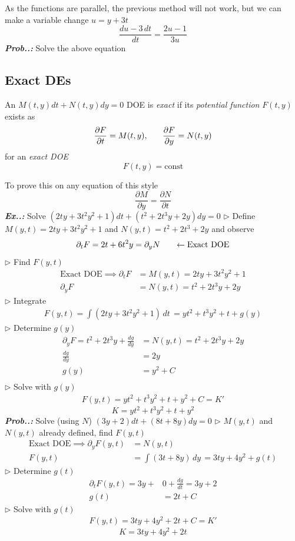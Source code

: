 \documentclass[a4paper]{article}
\begin{document}
As the functions are parallel, the previous method will not work, but we can make a variable change $u=y+3t$
$$
\boxed{\frac{du-3\,dt}{dt}=\frac{2u-1}{3u}}
$$
\vspace{2ex}\textit{\textbf{Prob.\thesection.\theprob:}} Solve the above equation

\subsection{Exact DEs}
\setcounter{equation}{0}
An $M(t,y)dt+N(t,y)dy=0$ DOE is \textit{exact} if its \textit{potential function} $F(t,y)$ exists as
$$
\frac{\partial F}{\partial t}=M(t,y),\hspace{4ex} \frac{\partial F}{\partial y}=N(t,y)
$$
for an \textit{exact DOE} 
$$
F(t,y)=\text{const}
$$

To prove this on any equation of this style
$$
\frac{\partial M}{\partial y}=\frac{\partial N}{\partial t}
$$
\vspace{2ex}\textbf{\textit{Ex.\thesection.\theex: }}Solve $(2ty+3t^{2}y^{2}+1)dt+(t^{2}+2t^{3}y+2y)dy=0$ 
$\triangleright$ Define $M(y,t)=2ty+3t^{2}y^{2}+1$ and $N(y,t)=t^{2}+2t^{3}+2y$ and observe
$$
\partial_{t}F=2t+6t^{2}y=\partial_{y}N\hspace{4ex}\leftarrow\text{Exact DOE}
$$
$\triangleright$ Find $F(y,t)$
\begin{align}
\text{Exact DOE}\implies \partial _{t}F&=M(y,t)=2ty+3t^{2}y^{2}+1 \\
\partial_{y}F&=N(y,t)=t^{2}+2t^{3}y+2y
\end{align}
$\triangleright$ Integrate
\begin{align}
F(y,t)=\int (2ty+3t^{2}y^{2}+1) \, dt\, =yt^{2}+t^{3}y^{2}+t+g(y)
\end{align}
$\triangleright$ Determine $g(y)$
\begin{align}
\partial_{y}F=t^{2}+2t^{3}y+\frac{dg}{dy}&=N(y,t)=t^{2}+2t^{3}y+2y \\
\frac{dg}{dy}&=2y \\
g(y)&=y^{2}+C \\
\end{align}
$\triangleright$ Solve with $g(y)$
\begin{align}
F(y,t)=yt^{2}+t^{3}y^{2}+t+y^{2}+C=K'
\end{align}
$$
\boxed{K=yt^{2}+t^{3}y^{2}+t+y^{2}}
$$
\vspace{2ex}\textbf{\textit{Prob.\thesection.\theprob: }}Solve (using $N$) $(3y+2)dt+(8t+8y)dy=0$
$\triangleright$ $M(y,t)$ and $N(y,t)$ already defined, find $F(y,t)$ 
\begin{align}
\text{Exact DOE}\implies \partial_{y}F(y,t)&=N(y,t) \\
F(y,t)&=\int (3t+8y) \, dy\, =3ty+4y^{2}+g(t)
\end{align}
$\triangleright$ Determine $g(t)$
\begin{align}
\partial_{t}F(y,t)=3y+&0+\frac{dg}{dt}=3y+2 \\
g(t)&=2t+C
\end{align}
$\triangleright$ Solve with $g(t)$ 
\begin{align}
F(y,t)=3ty+4y^{2}+2t+C=K'
\end{align}
$$
\boxed{K=3ty+4y^{2}+2t}
$$
\end{document}
